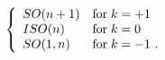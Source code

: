 \begin{equation}\label{symgps}
\left\{
\begin{array}{ll}
SO(n+1) & {\rm for}\; k = +1\\
ISO(n) & {\rm for}\; k = 0 \\
SO(1,n) &{\rm for}\; k = -1\ .
\end{array} \right.
\end{equation}

